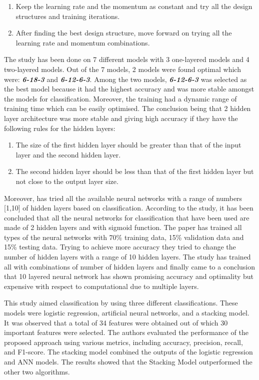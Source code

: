 \documentclass[conference]{IEEEtran}
\begin{document}
\begin{enumerate}
    \item Keep the learning rate and the momentum as constant and try all the design structures and training iterations.
    \item After finding the best design structure, move forward on trying all the learning rate and momentum combinations.
\end{enumerate}

The study has been done on 7 different models with 3 one-layered models and 4 two-layered models. Out of the 7 models, 2 models were found optimal which were: \emph{\textbf{6-18-3}} and \emph{\textbf{6-12-6-3}}. Among the two models, \emph{\textbf{6-12-6-3}} was selected as the best model because it had the highest accuracy and was more stable amongst the models for classification. Moreover, the training had a dynamic range of training time which can be easily optimised. The conclusion being that 2 hidden layer architecture was more stable and giving high accuracy if they have the following rules for the hidden layers:

\begin{enumerate}
    \item The size of the first hidden layer should be greater than that of the input layer and the second hidden layer.

    \item The second hidden layer should be less than that of the first hidden layer but not close to the output layer size.
\end{enumerate}

Moreover, \cite{b2} has tried all the available neural networks with a range of numbers [1,10] of hidden layers based on classification. According to the study, it has been concluded that all the neural networks for classification that have been used are made of 2 hidden layers and with sigmoid function. The paper has trained all types of the neural networks with 70\% training data, 15\% validation data and 15\% testing data. Trying to achieve more accuracy they tried to change the number of hidden layers with a range of 10 hidden layers. The study has trained all with combinations of number of hidden layers and finally came to a conclusion that 10 layered neural network has shown promising accuracy and optimality but expensive with respect to computational due to multiple layers.

This \cite{b3} study aimed classification by using three different classifications. These models were logistic regression, artificial neural networks, and a stacking model. It was observed that a total of 34 features were obtained out of which 30 important features were selected. The authors evaluated the performance of the proposed approach using various metrics, including accuracy, precision, recall, and F1-score. The stacking model combined the outputs of the logistic regression and ANN models. The results showed that the Stacking Model outperformed the other two algorithms.
\end{document}
